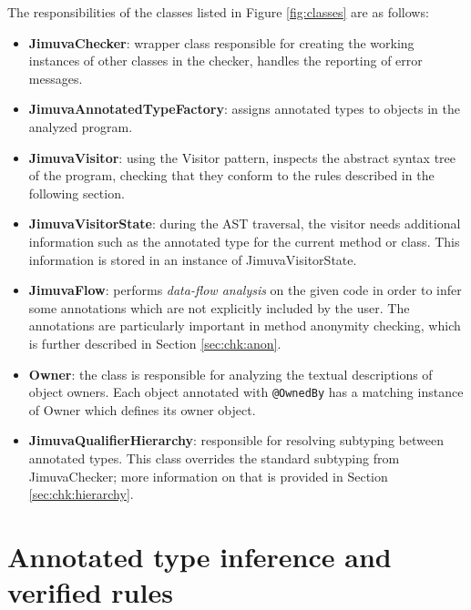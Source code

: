 \documentclass{pracamgr}
\theoremstyle{break}
\theoremstyle{break}
\theoremstyle{break}
\begin{document}
The responsibilities of the classes listed in Figure \ref{fig:classes}
are as follows:
\begin{itemize}
\item \textbf{JimuvaChecker}: wrapper class responsible for creating
  the working instances of other classes in the checker, handles the
  reporting of error messages.
\item \textbf{JimuvaAnnotatedTypeFactory}: assigns annotated types to
  objects in the analyzed program.
\item \textbf{JimuvaVisitor}: using the Visitor pattern, inspects the
  abstract syntax tree of the program, checking that they conform to
  the rules described in the following section. 
\item \textbf{JimuvaVisitorState}: during the AST traversal, the
  visitor needs additional information such as the annotated type for
  the current method or class. This information is stored in an
  instance of JimuvaVisitorState. 
\item \textbf{JimuvaFlow}: performs \emph{data-flow analysis} on the
  given code in order to infer some annotations which are not
  explicitly included by the user. The annotations are particularly
  important in method anonymity checking, which is further described
  in Section \ref{sec:chk:anon}.
\item \textbf{Owner}: the class is responsible for analyzing the
  textual descriptions of object owners. Each object annotated with
  \texttt{@OwnedBy} has a matching instance of Owner which defines its
  owner object.
\item \textbf{JimuvaQualifierHierarchy}: responsible for resolving
  subtyping between annotated types. This class overrides the standard
  subtyping from JimuvaChecker; more information on that is provided
  in Section \ref{sec:chk:hierarchy}. 
\end{itemize}

\section{Annotated type inference and verified rules}
\label{sec:rules}
\end{document}
